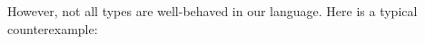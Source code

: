 \begin{code}%
\>[0]\AgdaSpace{}%
\AgdaSymbol{:}\AgdaSpace{}%
\AgdaSpace{}%
\AgdaSpace{}%
\AgdaSpace{}%
\AgdaSpace{}%
\<%
\\
\>[0]\AgdaSpace{}%
\AgdaSpace{}%
\AgdaSymbol{=}\AgdaSpace{}%
\AgdaInductiveConstructor{[]}\<%
\\
\>[0]\AgdaSpace{}%
\AgdaSymbol{(}\AgdaSpace{}%
\AgdaSpace{}%
\AgdaSpace{}%
\AgdaSymbol{)}\AgdaSpace{}%
\AgdaSymbol{=}\AgdaSpace{}%
\AgdaSpace{}%
\AgdaSpace{}%
\AgdaOperator{\AgdaFunction{++}}\AgdaSpace{}%
\AgdaSymbol{(}\AgdaSpace{}%
\AgdaSpace{}%
\AgdaSpace{}%
\AgdaSymbol{)}\<%
\end{code}

However, not all types are well-behaved in our language. Here is a typical counterexample:

